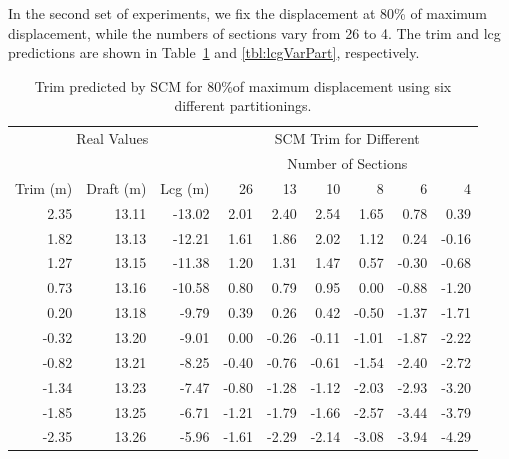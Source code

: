 \documentclass[runningheads]{llncs}
\begin{document}
In the second set of experiments, we fix the displacement at 80\% of maximum  displacement, while the numbers of sections vary from 26 to 4. The trim and lcg predictions are shown in Table~\ref{tbl:trimVarPart} and \ref{tbl:lcgVarPart}, respectively.
\begin{table}[h!]
\begin{tabular}{rrr|rrrrrr}
\multicolumn{3}{c|}{Real Values}&\multicolumn{6}{c}{SCM Trim for Different}\\
\multicolumn{3}{c|}{}  &\multicolumn{6}{c}{Number of Sections}\\
Trim (m)       & Draft (m)   & Lcg (m)       & 26        &13        &10        &8          &6          &4\\
\hline
2.35        &13.11  &-13.02 & 2.01   &2.40    &2.54    &1.65    &0.78    &0.39\\
1.82        &13.13  &-12.21 &             1.61 &1.86           &2.02    &1.12    &0.24    &-0.16\\
1.27        &13.15  &-11.38 & 1.20 &1.31       &1.47    &0.57    &-0.30   &-0.68\\
0.73        &13.16  &-10.58 &             0.80 &0.79           &0.95    &0.00    &-0.88   &-1.20\\
0.20        &13.18  &-9.79   & 0.39 &0.26       &0.42    &-0.50   &-1.37   &-1.71\\
-0.32      &13.20  &-9.01   & 0.00 &-0.26     &-0.11   &-1.01   &-1.87   &-2.22\\
-0.82      &13.21  &-8.25   & -0.40 &-0.76   &-0.61   &-1.54   &-2.40   &-2.72\\
-1.34      &13.23  &-7.47   &             -0.80 &-1.28        &-1.12   &-2.03   &-2.93   &-3.20\\
-1.85      &13.25  &-6.71   &             -1.21 &-1.79        &-1.66   &-2.57   &-3.44   &-3.79\\
-2.35      &13.26  &-5.96   & -1.61 &-2.29   &-2.14   &-3.08   &-3.94   &-4.29\\
\end{tabular}
\caption{Trim predicted by SCM for 80\%of maximum displacement using six different partitionings.}
\label{tbl:trimVarPart}
\end{table}
\end{document}
